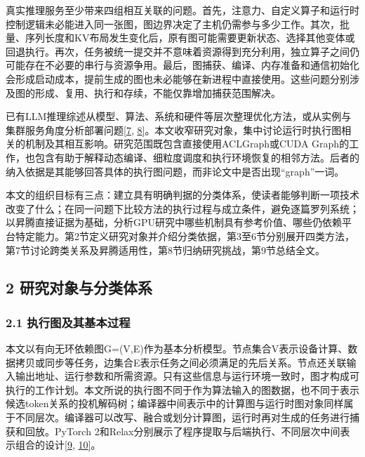 \documentclass[UTF8,11pt,fontset=windows]{ctexart}
\begin{document}
真实推理服务至少带来四组相互关联的问题。首先，注意力、自定义算子和运行时控制逻辑未必能进入同一张图，图边界决定了主机仍需参与多少工作。其次，批量、序列长度和KV布局发生变化后，原有图可能需要更新状态、选择其他变体或回退执行。再次，任务被统一提交并不意味着资源得到充分利用，独立算子之间仍可能存在不必要的串行与资源争用。最后，图捕获、编译、内存准备和通信初始化会形成启动成本，提前生成的图也未必能够在新进程中直接使用。这些问题分别涉及图的形成、复用、执行和存续，不能仅靠增加捕获范围解决。

已有LLM推理综述从模型、算法、系统和硬件等层次整理优化方法，或从实例与集群服务角度分析部署问题\protect\hyperlink{ref-7}{{[}7}, \protect\hyperlink{ref-8}{8{]}}。本文收窄研究对象，集中讨论运行时执行图相关的机制及其相互影响。研究范围既包含直接使用ACLGraph或CUDA Graph的工作，也包含有助于解释动态编译、细粒度调度和执行环境恢复的相邻方法。后者的纳入依据是其能够回答具体的执行图问题，而非论文中是否出现``graph''一词。

本文的组织目标有三点：建立具有明确判据的分类体系，使读者能够判断一项技术改变了什么；在同一问题下比较方法的执行过程与成立条件，避免逐篇罗列系统；以昇腾直接证据为基础，分析GPU研究中哪些机制具有参考价值、哪些仍依赖平台特定能力。第2节定义研究对象并介绍分类依据，第3至6节分别展开四类方法，第7节讨论跨类关系及昇腾适用性，第8节归纳研究挑战，第9节总结全文。

\hypertarget{section-2}{%
\subsection{\texorpdfstring{\textbf{2 研究对象与分类体系}}{2 研究对象与分类体系}}\label{section-2}}

\hypertarget{section-2-1}{%
\subsubsection{\texorpdfstring{\textbf{2.1 执行图及其基本过程}}{2.1 执行图及其基本过程}}\label{section-2-1}}

本文以有向无环依赖图G=(V,E)作为基本分析模型。节点集合V表示设备计算、数据拷贝或同步等任务，边集合E表示任务之间必须满足的先后关系。节点还关联输入输出地址、运行参数和所需资源。只有这些信息与运行环境一致时，图才构成可执行的工作计划。本文所说的执行图不同于作为算法输入的图数据，也不同于表示候选token关系的投机解码树；编译器中间表示中的计算图与运行时图对象同样属于不同层次。编译器可以改写、融合或划分计算图，运行时再对生成的任务进行捕获和回放。PyTorch 2和Relax分别展示了程序提取与后端执行、不同层次中间表示组合的设计\protect\hyperlink{ref-9}{{[}9}, \protect\hyperlink{ref-10}{10{]}}。
\end{document}
